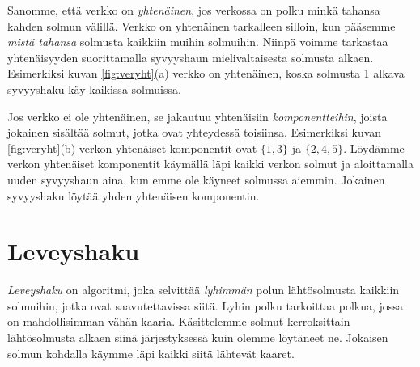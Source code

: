 Sanomme, että verkko on \emph{yhtenäinen},
jos verkossa on polku minkä tahansa kahden solmun välillä.
Verkko on yhtenäinen tarkalleen silloin,
kun pääsemme \emph{mistä tahansa} solmusta
kaikkiin muihin solmuihin.
Niinpä voimme tarkastaa yhtenäisyyden suorittamalla
syvyyshaun mielivaltaisesta solmusta alkaen.
Esimerkiksi kuvan \ref{fig:veryht}(a) verkko on yhtenäinen,
koska solmusta 1 alkava syvyyshaku käy kaikissa solmuissa.

Jos verkko ei ole yhtenäinen, se jakautuu
yhtenäisiin \emph{komponentteihin},
joista jokainen sisältää solmut, jotka ovat yhteydessä
toisiinsa.
Esimerkiksi kuvan \ref{fig:veryht}(b) verkon
yhtenäiset komponentit ovat $\{1,3\}$ ja $\{2,4,5\}$.
Löydäm\-me verkon yhtenäiset komponentit
käymällä läpi kaikki verkon solmut ja aloittamalla
uuden syvyyshaun aina, kun emme ole käyneet solmussa aiemmin.
Jokainen syvyyshaku löytää yhden yhtenäisen komponentin.

\section{Leveyshaku}

\emph{Leveyshaku} on algoritmi, joka selvittää \emph{lyhimmän} polun
lähtösolmusta kaikkiin solmuihin, jotka ovat saavutettavissa siitä.
Lyhin polku tarkoittaa polkua, jossa on mahdollisimman vähän kaaria.
Käsittelemme solmut kerroksittain lähtösolmusta alkaen
siinä järjestyksessä kuin olemme löytäneet ne.
Jokaisen solmun kohdalla käymme läpi kaikki siitä lähtevät kaaret.

